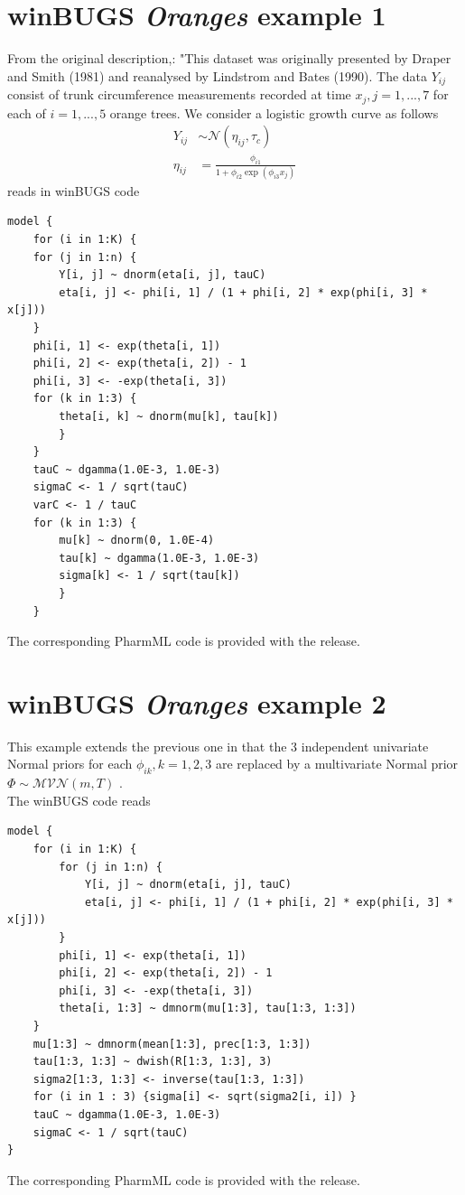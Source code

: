 \section{winBUGS \emph{Oranges} example 1}

From the original description,\cite{winBUGSvol2}: 
"This dataset was originally presented by Draper and Smith (1981) and 
reanalysed by Lindstrom and Bates (1990). The data $Y_{ij}$ consist of trunk circumference 
measurements recorded at time $x_j, j=1,...,7$ for each of $i = 1,..., 5$ orange trees. 
We consider a logistic growth curve as follows
\begin{align*}
Y_{ij} &\sim \mathcal{N}(\eta_{ij}, \tau_c) \\ 
\eta_{ij} &= \frac{\phi_{i1}}{1 + \phi_{i2} \exp(\phi_{i3} x_j)}
\end{align*}
reads in winBUGS code
\lstset{language=MLX}
\begin{lstlisting}
model {
	for (i in 1:K) {
	for (j in 1:n) {
		Y[i, j] ~ dnorm(eta[i, j], tauC)
		eta[i, j] <- phi[i, 1] / (1 + phi[i, 2] * exp(phi[i, 3] * x[j]))
	}
	phi[i, 1] <- exp(theta[i, 1])
	phi[i, 2] <- exp(theta[i, 2]) - 1
	phi[i, 3] <- -exp(theta[i, 3])
	for (k in 1:3) {
		theta[i, k] ~ dnorm(mu[k], tau[k])
		}
	} 
	tauC ~ dgamma(1.0E-3, 1.0E-3)
	sigmaC <- 1 / sqrt(tauC)
	varC <- 1 / tauC
	for (k in 1:3) {
		mu[k] ~ dnorm(0, 1.0E-4)
		tau[k] ~ dgamma(1.0E-3, 1.0E-3)
		sigma[k] <- 1 / sqrt(tau[k])
		}
	}
\end{lstlisting} 
The corresponding PharmML code is provided with the release.

\section{winBUGS \emph{Oranges} example 2}
This example extends the previous one 
 in that the 3 independent univariate Normal 
priors for each $\phi_{ik}, k=1,2,3$ are replaced by a multivariate Normal 
prior $\Phi \sim \mathcal {MVN}(m, T)$ \cite{winBUGSvol2}.\\
The winBUGS code reads
\lstset{language=MLX}
\begin{lstlisting}
model {
	for (i in 1:K) {
		for (j in 1:n) {
			Y[i, j] ~ dnorm(eta[i, j], tauC)
			eta[i, j] <- phi[i, 1] / (1 + phi[i, 2] * exp(phi[i, 3] * x[j]))
		}
		phi[i, 1] <- exp(theta[i, 1])
		phi[i, 2] <- exp(theta[i, 2]) - 1
		phi[i, 3] <- -exp(theta[i, 3])
		theta[i, 1:3] ~ dmnorm(mu[1:3], tau[1:3, 1:3])
	}
	mu[1:3] ~ dmnorm(mean[1:3], prec[1:3, 1:3])
	tau[1:3, 1:3] ~ dwish(R[1:3, 1:3], 3)
	sigma2[1:3, 1:3] <- inverse(tau[1:3, 1:3])
	for (i in 1 : 3) {sigma[i] <- sqrt(sigma2[i, i]) }
	tauC ~ dgamma(1.0E-3, 1.0E-3)
	sigmaC <- 1 / sqrt(tauC)
}
\end{lstlisting} 
The corresponding PharmML code is provided with the release.


